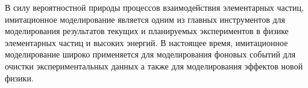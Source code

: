 В силу вероятностной природы процессов взаимодействия элементарных частиц, имитационное моделирование является одним из главных инструментов для моделирования результатов текущих и планируемых экспериментов в физике элементарных частиц и высоких энергий. В настоящее время, имитационное моделирование широко применяется для моделирования фоновых событий для очистки экспериментальных данных а также для моделирования эффектов новой физики.

